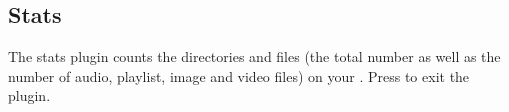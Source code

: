 \subsection{Stats}

The stats plugin counts the directories and files
(the total number as well as the number
of audio, playlist, image and video files)
on your \dap{}.
Press \ActionStdCancel{} to exit the plugin.
